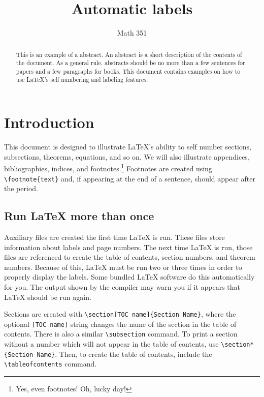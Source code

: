 \documentclass{article}
\title{Automatic labels}
\author{Math 351}
\date{}
\begin{document}
\maketitle

\begin{abstract}
  This is an example of a abstract.   An abstract is a short description of the contents of the document.  As a general rule, abstracts should be no more than a few sentences for papers and a few paragraphs for books.  This document contains examples on how to use \LaTeX{'s} self
numbering and labeling features.
\end{abstract}

\tableofcontents

\section{Introduction}

This document is designed to illustrate \LaTeX{'s} ability to self number sections, subsections,
theorems, equations, and so on.  We will also illustrate appendices, bibliographies, indices, and
footnotes.\footnote{Yes, even footnotes!  Oh, lucky day!}  Footnotes  are created
using \verb~\footnote{text}~ and, if appearing at the end of a sentence, should appear after
the period.

\subsection{Run \LaTeX{} more than once}

Auxiliary files are created the first time \LaTeX{} is run.  These files store information about
labels and page numbers.  The next time \LaTeX{} is run, those files are referenced to create the 
table of contents, section numbers, and theorem numbers.  Because of this, \LaTeX{} must be run 
two or three times in order to properly display the labels.  Some bundled \LaTeX{} software do this 
automatically for you.  The output shown by the compiler may 
warn you if it appears that \LaTeX{} should be run again.

Sections  are created with \verb~\section[TOC name]{Section Name}~, where the optional
\verb~[TOC name]~ string changes the name of the section in the table of contents.
There is also a similar  \verb~\subsection~ command.  To print a section without a number which
will not appear in the table of contents, use \verb~\section*{Section Name}~.  Then, to create
the table of contents, include the \verb~\tableofcontents~ command.  
\end{document}
